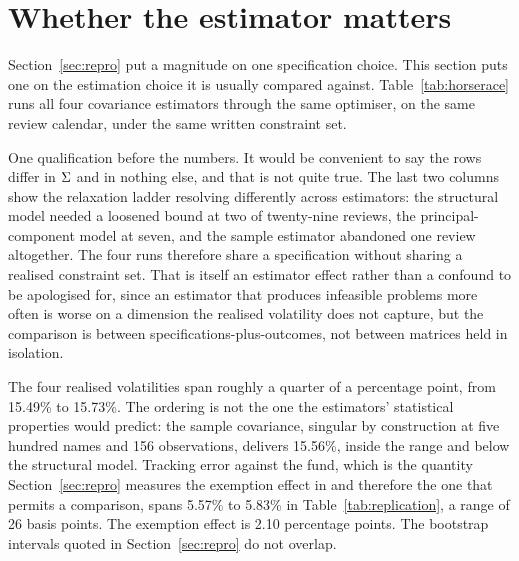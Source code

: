 \section{Whether the estimator matters}
\label{sec:estimator}
Section~\ref{sec:repro} put a magnitude on one specification choice. This
section puts one on the estimation choice it is usually compared against.
Table~\ref{tab:horserace} runs all four covariance estimators through the same
optimiser, on the same review calendar, under the same written constraint set.



One qualification before the numbers. It would be convenient to say the rows
differ in $\Sigma$ and in nothing else, and that is not quite true. The last two
columns show the relaxation ladder resolving differently across estimators: the
structural model needed a loosened bound at two of twenty-nine reviews, the
principal-component model at seven, and the sample estimator abandoned one
review altogether. The four runs therefore share a specification without
sharing a realised constraint set. That is itself an estimator effect rather
than a confound to be apologised for, since an estimator that produces
infeasible problems more often is worse on a dimension the realised volatility
does not capture, but the comparison is between specifications-plus-outcomes,
not between matrices held in isolation.

The four realised volatilities span roughly a quarter of a percentage point,
from 15.49\% to 15.73\%. The ordering is not the one the estimators'
statistical properties would predict: the sample covariance, singular by
construction at five hundred names and 156 observations, delivers 15.56\%,
inside the range and below the structural model. Tracking error against the
fund, which is the quantity Section~\ref{sec:repro} measures the exemption
effect in and therefore the one that permits a comparison, spans 5.57\% to
5.83\% in Table~\ref{tab:replication}, a range of 26 basis points. The
exemption effect is 2.10 percentage points. The bootstrap intervals quoted in
Section~\ref{sec:repro} do not overlap.

